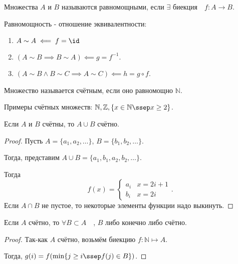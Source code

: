 \begin{definition} \thmslashn 

    Множества $A$ и $B$ называются равномощными, если $\exists{\text{ биекция}}\quad f : A \to B $.
\end{definition}
\begin{remark} \thmslashn

    Равномощность - отношение эквивалентности:
    \begin{enumerate}
        \item $A \sim A \impliedby f = \id$
        \item $(A \sim B \implies B \sim A) \impliedby g = f^{-1}$.
        \item $(A \sim B \land B \sim C \implies A \sim C) \impliedby h = g \circ f$.
    \end{enumerate}
\end{remark}
\begin{definition} \thmslashn 

    Множество называется счётным, если оно равномощно $\mathbb{N}$.
\end{definition}
\begin{example} \thmslashn

    Примеры счётных множеств: $\mathbb{N}, \mathbb{Z}, \{x\in \mathbb{N}\ssep x \ge 2\} $.
\end{example}
\begin{lemma} \thmslashn

    Если $A$ и $B$ счётны, то $A \cup B$ счётно.
    \begin{proof} \thmslashn
    
        Пусть $A = \{a_1, a_2, \ldots\} $, $B = \{b_1, b_2, \ldots\} $.

        Тогда, представим $A \cup B = \{a_1, b_1, a_2, b_2, \ldots\} $.

        Тогда 
        \[ f(x) = \begin{cases}
            a_{i} & x = 2i+1\\
            b_{i} & x = 2i
        \end{cases} .\] 
        Если $A\cap B$ не пустое, то некоторые элементы функции надо выкинуть.
    \end{proof}
\end{lemma}
\begin{lemma} \thmslashn

    Если $A$ счётно, то $\forall{B \subset A}\quad $, $B$ либо конечно либо счётно.
    \begin{proof} \thmslashn
    
        Так-как $A$ счётно, возьмём биекцию $f : \mathbb{N} \mapsto A$.

        Тогда, $g(i) = f(\min \{j \ge i \ssep f(j)\in B\} )$.
    \end{proof}
\end{lemma}

